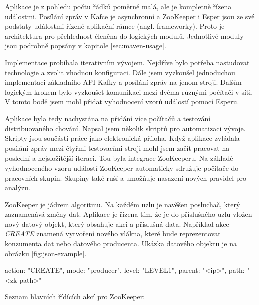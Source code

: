 \documentclass[
  digital, %
  table,   %
  nolof,     %
  nolot,     %
  twoside, %
  nocover,
  monochrome,
  12pt
]{fithesis3}
\begin{document}
Aplikace je z pohledu počtu řádků poměrně malá, ale je kompletně řízena událostmi. Posílání zpráv v Kafce je asynchronní a ZooKeeper i Esper jsou ze své podstaty událostmi řízené aplikační rámce (angl. frameworky). Proto je architektura pro přehlednost členěna do logických modulů. Jednotlivé moduly jsou podrobně popsány v kapitole \ref{sec:maven-usage}.

Implementace probíhala iterativním vývojem. Nejdříve bylo potřeba nastudovat technologie a zvolit vhodnou konfiguraci. Dále jsem vyzkoušel jednoduchou implementaci základního API Kafky a posílání zpráv na jenom stroji. Dalším logickým krokem bylo vyzkoušet komunikaci mezi dvěma různými počítači v síti. V tomto bodě jsem mohl přidat vyhodnocení vzorů událostí pomocí Esperu.

Aplikace byla tedy nachystána na přidání více počítačů a testování distribuovaného chování. Napsal jsem několik skriptů pro automatizaci vývoje. Skripty jsou součástí práce jako elektronická příloha. Když aplikace zvládala posílání zpráv mezi čtyřmi testovacími stroji mohl jsem začít pracovat na poslední a nejsložitější iteraci. Tou byla integrace ZooKeeperu. Na základě vyhodnoceného vzoru událostí ZooKeeper automaticky sdružuje počítače do pracovních skupin. Skupiny také ruší a umožňuje nasazení nových pravidel pro analýzu.

ZooKeeper je jádrem algoritmu. Na každém uzlu je navěšen posluchač, který zaznamenává změny dat. Aplikace je řízena tím, že je do příslušného uzlu vložen nový datový objekt, který obsahuje akci a příslušná data. Například akce \textit{CREATE} znamená vytvoření nového vlákna, které bude reprezentovat konzumenta dat nebo datového producenta. Ukázka datového objektu je na obrázku \ref{fig:json-example}.

\begin{center}
\begin{minipage}[H]{.8\linewidth}
\centering
	\begin{mylisting}
{
	action: "CREATE",
	mode: "producer",
	level: "LEVEL1",
	parent: "<ip>",
	path: "<zk-path>"
}
	\end{mylisting}
	\label{fig:json-example} 
\end{minipage}
\end{center}

Seznam hlavních řídících akcí pro ZooKeeper:
\end{document}
